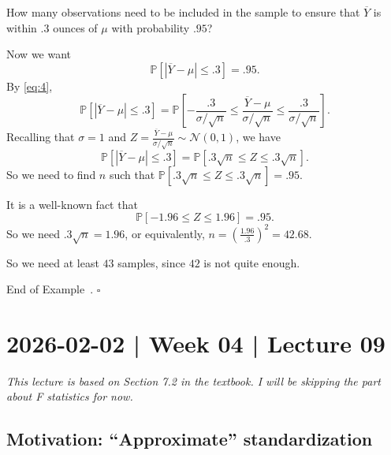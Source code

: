 \documentclass[10pt]{article}
\theoremstyle{definition}
\newtheorem{example}[theorem]{Example}
\renewenvironment{example}
{\begin{oldexample}}
  {\par\smallskip\hfill   End of Example~\theexample. $\square$    \par\end{oldexample}}
\newcommand{\1}[1]{\textbf{1}_{\left[#1\right]}} %
\def\P{\mathbb{P}} %
\begin{document}
\begin{example}[Example 7.3 in textbook]
  How many observations need to be included in the sample to ensure that
  $\overline{Y}$ is within $.3$ ounces of $\mu$ with probability $.95$?

  Now we want
  \begin{equation*}
    \P\left[\left| \overline{Y} -\mu \right| \leq .3\right] = .95.
  \end{equation*}
  By \cref{eq:4}, 
  \begin{equation*}
    \P\left[\left| \overline{Y} -\mu \right| \leq .3\right] = \P\left[- \frac{.3}{\sigma/\sqrt{n}}\leq \frac{\overline{Y}-\mu}{\sigma/\sqrt{n}} \leq \frac{.3}{\sigma/\sqrt{n}}\right].
  \end{equation*}
  Recalling that $\sigma=1$ and
  $Z=\frac{\overline{Y}-\mu}{\sigma/\sqrt{n}}\sim \mathcal{N}(0,1)$, we have
  \begin{equation*}
    \P\left[\left| \overline{Y}-\mu \right| \leq .3 \right] = \P\left[.3 \sqrt{n}\leq Z \leq .3 \sqrt{n}\right].
  \end{equation*}
  So we need to find $n$ such that $\P\left[.3 \sqrt{n}\leq Z \leq .3
    \sqrt{n}\right]=.95$.

  It is a well-known fact that
  \begin{equation*}
    \P\left[-1.96 \leq Z \leq 1.96\right] = .95.
  \end{equation*}
  So we need $.3 \sqrt{n}=1.96$, or equivalently, $n= \left( \frac{1.96}{.3}
  \right)^{2}= 42.68$.

  So we need at least $43$ samples, since $42$ is not quite enough.
\end{example}

\newpage
\section{2026-02-02 | Week 04 | Lecture 09}

\textit{This lecture is based on Section 7.2 in the textbook. I will be
  skipping the part about F statistics for now.}

\subsection{Motivation: ``Approximate'' standardization}
\label{sec:motivation:-approximate-standardization}
\end{document}
